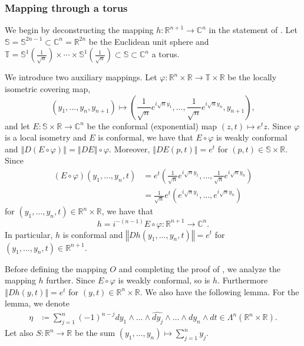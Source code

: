 \documentclass[a4paper,leqno,11pt]{amsart}
\numberwithin{equation}{section}
\theoremstyle{remark}
\theoremstyle{remark}
\newcommand{\R}{\mathbb{R}}
\newcommand{\norm}[1]{ \left\Vert #1 \right\Vert }	%
\newcommand{\C}{\mathbb{C}}
\newcommand{\bS}{\mathbb{S}}
\newcommand{\bT}{\mathbb{T}}
\begin{document}
\subsubsection{Mapping through a torus}
We begin by deconstructing the mapping $h \colon \R^{n+1} \to \C^n$ in the statement of .  Let $\bS = \bS^{2n-1} \subset \C^n=\R^{2n}$ be the Euclidean unit sphere and $\bT = \bS^1(\frac{1}{\sqrt{n}})\times \cdots \times \bS^1(\frac{1}{\sqrt{n}}) \subset \bS \subset \C^n$ a torus.  

We introduce two auxiliary mappings. Let $\varphi \colon \R^n \times \R \to \bT \times \R$ be the locally isometric covering map,
\[
(y_1,\ldots, y_n,y_{n+1}) \mapsto \left( \frac{1}{\sqrt{n}}e^{i\sqrt{n} y_1}, \ldots, \frac{1}{\sqrt{n}}e^{i\sqrt{n} y_n},y_{n+1}\right),
\]
and let $E \colon \bS \times \R \to \C^n$ be the conformal (exponential) map $(z,t) \mapsto e^tz$. Since $\varphi$ is a local isometry and $E$ is conformal, we have that $E\circ \varphi$ is weakly conformal and $\norm{D(E\circ \varphi)} = \norm{DE} \circ \varphi$. Moreover, $\norm{DE(p,t)} = e^t$ for $(p,t)\in \bS \times \R$. Since 
\begin{align*}
(E \circ \varphi)(y_1,\ldots, y_n,t) 
&= e^t \left( \frac{1}{\sqrt{n}}e^{i\sqrt{n} y_1}, \ldots, \frac{1}{\sqrt{n}}e^{i\sqrt{n} y_n}\right)
\\
&= \frac{1}{\sqrt{n}} e^t \left( e^{i\sqrt{n} y_1}, \ldots, e^{i\sqrt{n} y_n}\right)
\end{align*}
for $(y_1,\ldots, y_n, t)\in \R^n\times \R$, we have that 
\[
h =  i^{-(n-1)} E\circ \varphi \colon \R^{n+1} \to \C^n.
\]
In particular, $h$ is conformal and $\norm{Dh(y_1,\ldots, y_n,t)} = e^{t}$ for $(y_1,\ldots, y_n,t) \in \R^{n+1}$.


Before defining the mapping $O$ and completing the proof of , we analyze the mapping $h$ further. Since $E \circ \varphi$ is weakly conformal, so is $h$. Furthermore $\norm{Dh(y,t)} =  e^{t}$ for $(y,t) \in \R^n \times \R$. We also have the following lemma. For the lemma, we denote
\begin{align*}
    \eta
    &\coloneqq
    \sum_{ j = 1 }^{ n }
        (-1)^{ n-j }
        dy_1 \wedge \dots \wedge \widehat{ dy_j } \wedge \dots \wedge dy_{n} \wedge dt 
    \in
    \Lambda^{n}( \mathbb{R}^n \times \mathbb{R} ).
\end{align*}
Let also $S \colon \R^n \to \R$ be the sum $(y_1,\ldots, y_n) \mapsto \sum_{j=1}^n y_j$.
\end{document}
